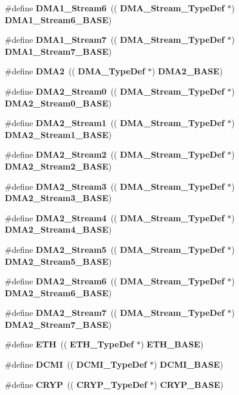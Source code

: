 \begin{DoxyCompactItemize}
\item 
\#define \textbf{ D\+M\+A1\+\_\+\+Stream6}~((\textbf{ D\+M\+A\+\_\+\+Stream\+\_\+\+Type\+Def} $\ast$) \textbf{ D\+M\+A1\+\_\+\+Stream6\+\_\+\+B\+A\+SE})
\item 
\#define \textbf{ D\+M\+A1\+\_\+\+Stream7}~((\textbf{ D\+M\+A\+\_\+\+Stream\+\_\+\+Type\+Def} $\ast$) \textbf{ D\+M\+A1\+\_\+\+Stream7\+\_\+\+B\+A\+SE})
\item 
\#define \textbf{ D\+M\+A2}~((\textbf{ D\+M\+A\+\_\+\+Type\+Def} $\ast$) \textbf{ D\+M\+A2\+\_\+\+B\+A\+SE})
\item 
\#define \textbf{ D\+M\+A2\+\_\+\+Stream0}~((\textbf{ D\+M\+A\+\_\+\+Stream\+\_\+\+Type\+Def} $\ast$) \textbf{ D\+M\+A2\+\_\+\+Stream0\+\_\+\+B\+A\+SE})
\item 
\#define \textbf{ D\+M\+A2\+\_\+\+Stream1}~((\textbf{ D\+M\+A\+\_\+\+Stream\+\_\+\+Type\+Def} $\ast$) \textbf{ D\+M\+A2\+\_\+\+Stream1\+\_\+\+B\+A\+SE})
\item 
\#define \textbf{ D\+M\+A2\+\_\+\+Stream2}~((\textbf{ D\+M\+A\+\_\+\+Stream\+\_\+\+Type\+Def} $\ast$) \textbf{ D\+M\+A2\+\_\+\+Stream2\+\_\+\+B\+A\+SE})
\item 
\#define \textbf{ D\+M\+A2\+\_\+\+Stream3}~((\textbf{ D\+M\+A\+\_\+\+Stream\+\_\+\+Type\+Def} $\ast$) \textbf{ D\+M\+A2\+\_\+\+Stream3\+\_\+\+B\+A\+SE})
\item 
\#define \textbf{ D\+M\+A2\+\_\+\+Stream4}~((\textbf{ D\+M\+A\+\_\+\+Stream\+\_\+\+Type\+Def} $\ast$) \textbf{ D\+M\+A2\+\_\+\+Stream4\+\_\+\+B\+A\+SE})
\item 
\#define \textbf{ D\+M\+A2\+\_\+\+Stream5}~((\textbf{ D\+M\+A\+\_\+\+Stream\+\_\+\+Type\+Def} $\ast$) \textbf{ D\+M\+A2\+\_\+\+Stream5\+\_\+\+B\+A\+SE})
\item 
\#define \textbf{ D\+M\+A2\+\_\+\+Stream6}~((\textbf{ D\+M\+A\+\_\+\+Stream\+\_\+\+Type\+Def} $\ast$) \textbf{ D\+M\+A2\+\_\+\+Stream6\+\_\+\+B\+A\+SE})
\item 
\#define \textbf{ D\+M\+A2\+\_\+\+Stream7}~((\textbf{ D\+M\+A\+\_\+\+Stream\+\_\+\+Type\+Def} $\ast$) \textbf{ D\+M\+A2\+\_\+\+Stream7\+\_\+\+B\+A\+SE})
\item 
\#define \textbf{ E\+TH}~((\textbf{ E\+T\+H\+\_\+\+Type\+Def} $\ast$) \textbf{ E\+T\+H\+\_\+\+B\+A\+SE})
\item 
\#define \textbf{ D\+C\+MI}~((\textbf{ D\+C\+M\+I\+\_\+\+Type\+Def} $\ast$) \textbf{ D\+C\+M\+I\+\_\+\+B\+A\+SE})
\item 
\#define \textbf{ C\+R\+YP}~((\textbf{ C\+R\+Y\+P\+\_\+\+Type\+Def} $\ast$) \textbf{ C\+R\+Y\+P\+\_\+\+B\+A\+SE})

\end{DoxyCompactItemize}
